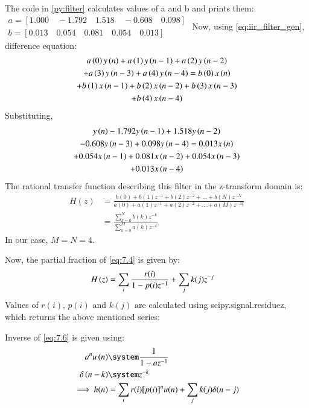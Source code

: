 \documentclass[journal,12pt,twocolumn]{IEEEtran}
\theoremstyle{remark}
\renewcommand\thesection{\arabic{section}}
\numberwithin{equation}{subsection}
\begin{document}
\begin{enumerate}[label=\thesection.\arabic*]
\solution The code in \ref{py:filter} calculates values of a and b and prints them:
$
\begin{array}{c}
  a = [ 1.000         \quad -1.792 \quad 1.518 \quad -0.608 \quad 0.098] \\
b = [0.013\quad 0.054 \quad 0.081\quad 0.054 \quad 0.013]
\end{array}
$
Now, using \eqref{eq:iir_filter_gen}, difference equation:
\begin{multline}
a\left(0\right)y\left(n\right) + a\left(1\right)y\left(n-1\right)+a\left(2\right)y\left(n-2\right)\\
+a\left(3\right)y\left(n-3\right)+a\left(4\right)y\left(n-4\right) =   b\left(0\right)x\left(n\right) \\
+ b\left(1\right)x\left(n-1\right)+b\left(2\right)x\left(n-2\right)+b\left(3\right)x\left(n-3\right)\\
+b\left(4\right)x\left(n-4\right) 
\end{multline}
Substituting,
\begin{multline}
    y\left(n\right) -1.792y\left(n-1\right)+1.518y\left(n-2\right)\\
-0.608y\left(n-3\right)+0.098y\left(n-4\right) = 0.013x\left(n\right) \\
+ 0.054x\left(n-1\right)+0.081x\left(n-2\right)+0.054x\left(n-3\right)\\
+0.013x\left(n-4\right) 
\end{multline}
The rational transfer function describing this filter in the z-transform domain is:
\begin{align}
     H(z) &= \frac{b(0) + b(1) z^{-1} + b(2) z^{-2} + \ldots + b(N) z^{-N}}{a(0) + a(1) z^{-1} + a(2) z^{-2} + \ldots + a(M) z^{-M}}\\ \label{eq:7.4}
    &= \frac{\sum_{k = 0}^{N}b(k)z^{-k}}{\sum_{k = 0}^{M}a(k)z^{-k}}
\end{align}
In our case, $M=N=4$.

Now, the partial fraction of \eqref{eq:7.4} is given by:
\begin{align}
   H\left(z\right)&= \sum_{i}\frac{r(i)}{1 - p(i)z^{-1}} + \sum_{j}k(j)z^{-j}\label{eq:7.6}
\end{align}
Values of $r(i)$, $p(i)$ and $k(j)$ are calculated using scipy.signal.residuez, which returns the above mentioned series:


Inverse of \eqref{eq:7.6} is given using:
\begin{align}
    a^{n}u\brak{n} &\system \frac{1}{1-az^{-1}}\\
    \delta\brak{n-k} &\system z^{-k}\\
    \implies h(n) &= \sum_{i}r(i)[p(i)]^nu(n) + \sum_{j}k(j)\delta(n - j)
\end{align}


\end{enumerate}
\end{document}
